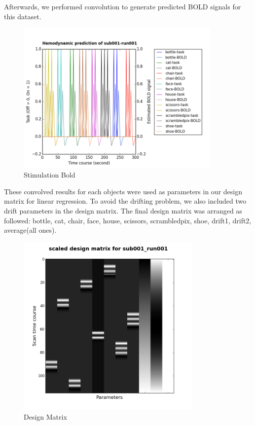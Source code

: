 \documentclass[11pt,twocolumn]{article}
\begin{document}
Afterwards, we performed convolution to generate predicted BOLD signals for this 
dataset.
\begin{figure}[h!]
\centering
\includegraphics[width=100mm]{sub001_run001_bold_prediction.png}
\caption{Stimulation Bold}
\end{figure}

These convolved results for each objects were used as parameters in 
our design matrix for linear regression. To avoid the drifting problem, we also 
included two drift parameters in the design matrix. The final design matrix was 
arranged as followed: bottle, cat, chair, face, house, scissors, scrambledpix, 
shoe, drift1, drift2, average(all ones). 
\begin{figure}[h!]
\centering
\includegraphics[width=90mm]{design_matrix_sub001_run001.png}
\caption{Design Matrix}
\end{figure}
\end{document}
